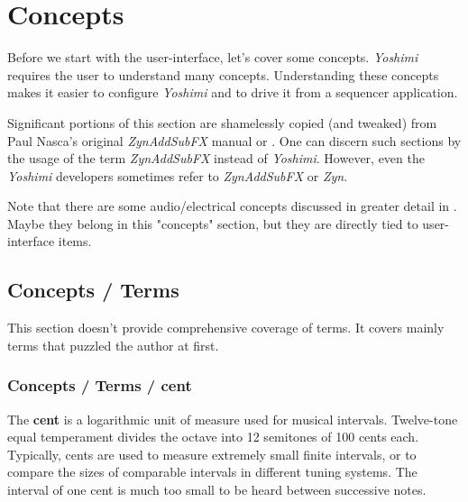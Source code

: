 %
%
%

\section{Concepts}
\label{sec:concepts}

   Before we start with the user-interface, let's cover some concepts.
   \textsl{Yoshimi} requires the user to understand many concepts.
   Understanding these concepts makes it easier to configure \textsl{Yoshimi}
   and to drive it from a sequencer application.
   
   Significant portions of this section are shamelessly copied (and tweaked)
   from Paul Nasca's original \textsl{ZynAddSubFX}
   manual \cite{zynodt} or \cite{zynpdf}.
   One can discern such sections by the usage of the term
   \textsl{ZynAddSubFX} instead of \textsl{Yoshimi}.
   However, even the \textsl{Yoshimi} developers sometimes
   refer to \textsl{ZynAddSubFX} or \textsl{Zyn}.

   Note that there are some audio/electrical concepts discussed in greater
   detail in
   .
   Maybe they belong in this "concepts" section, but
   they are directly tied to user-interface items.

\subsection{Concepts / Terms}
\label{subsec:concepts_terms}

   This section doesn't provide comprehensive coverage of terms.  It
   covers mainly terms that puzzled the author at first.

\subsubsection{Concepts / Terms / cent}
\label{subsubsec:concepts_terms_cent}

   The \textbf{cent}
   is a logarithmic unit of measure used for musical
   intervals.  Twelve-tone equal temperament divides the octave into 12
   semitones of 100 cents each. Typically, cents are used to measure
   extremely small finite intervals, or to compare the sizes of comparable
   intervals in different tuning systems.
   The interval of one cent is much too small to be heard between
   successive notes.


